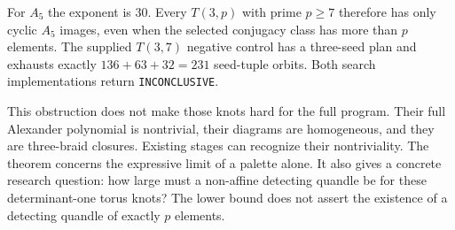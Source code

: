 For $A_5$ the exponent is $30$. Every $T(3,p)$ with prime $p\geq7$
therefore has only cyclic $A_5$ images, even when the selected conjugacy
class has more than $p$ elements. The supplied $T(3,7)$ negative control
has a three-seed plan and exhausts exactly $136+63+32=231$ seed-tuple
orbits. Both search implementations return \texttt{INCONCLUSIVE}.

This obstruction does not make those knots hard for the full program.
Their full Alexander polynomial is nontrivial, their diagrams are
homogeneous, and they are three-braid closures. Existing stages can
recognize their nontriviality. The theorem concerns the expressive limit
of a palette alone. It also gives a concrete research question: how large
must a non-affine detecting quandle be for these determinant-one torus
knots? The lower bound does not assert the existence of a detecting
quandle of exactly $p$ elements.
